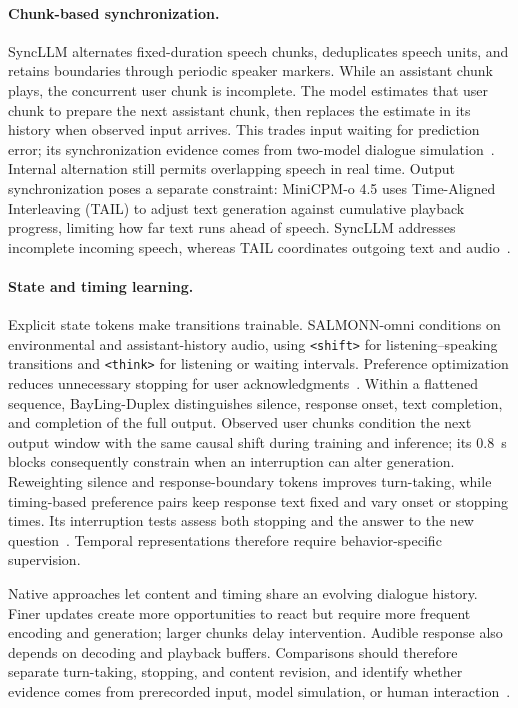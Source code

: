 \paragraph{Chunk-based synchronization.}
SyncLLM alternates fixed-duration speech chunks, deduplicates speech units, and retains boundaries through periodic speaker markers. While an assistant chunk plays, the concurrent user chunk is incomplete. The model estimates that user chunk to prepare the next assistant chunk, then replaces the estimate in its history when observed input arrives. This trades input waiting for prediction error; its synchronization evidence comes from two-model dialogue simulation~\citep{DBLP:conf/emnlp/VeluriPYGG24}. Internal alternation still permits overlapping speech in real time. Output synchronization poses a separate constraint: MiniCPM-o 4.5 uses Time-Aligned Interleaving (TAIL) to adjust text generation against cumulative playback progress, limiting how far text runs ahead of speech. SyncLLM addresses incomplete incoming speech, whereas TAIL coordinates outgoing text and audio~\citep{DBLP:journals/corr/abs-2604-27393}.

\paragraph{State and timing learning.}
Explicit state tokens make transitions trainable. SALMONN-\allowbreak omni conditions on environmental and assistant-history audio, using \texttt{<shift>} for listening--speaking transitions and \texttt{<think>} for listening or waiting intervals. Preference optimization reduces unnecessary stopping for user acknowledgments~\citep{DBLP:conf/nips/YuWYCTZSLWZ25}. Within a flattened sequence, BayLing-Duplex distinguishes silence, response onset, text completion, and completion of the full output. Observed user chunks condition the next output window with the same causal shift during training and inference; its 0.8~s blocks consequently constrain when an interruption can alter generation. Reweighting silence and response-boundary tokens improves turn-taking, while timing-based preference pairs keep response text fixed and vary onset or stopping times. Its interruption tests assess both stopping and the answer to the new question~\citep{DBLP:journals/corr/abs-2606-14528}. Temporal representations therefore require behavior-specific supervision.

Native approaches let content and timing share an evolving dialogue history. Finer updates create more opportunities to react but require more frequent encoding and generation; larger chunks delay intervention. Audible response also depends on decoding and playback buffers. Comparisons should therefore separate turn-taking, stopping, and content revision, and identify whether evidence comes from prerecorded input, model simulation, or human interaction~\citep{DBLP:journals/corr/abs-2410-00037,DBLP:conf/emnlp/VeluriPYGG24,DBLP:journals/corr/abs-2606-14528}.
